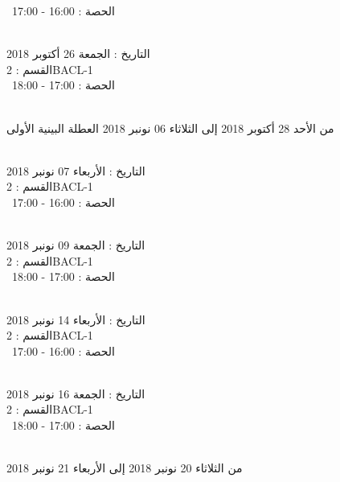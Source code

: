 \  
الحصة : 16:00 - 17:00 \\
\par
\noindent\makebox[\linewidth]{\rule{\paperwidth}{0.4pt}}
 \\
التاريخ : الجمعة 26 أكتوبر 2018 \\
القسم : 2BACL-1 \\
 \  
الحصة : 17:00 - 18:00 \\
\par
\noindent\makebox[\linewidth]{\rule{\paperwidth}{0.4pt}}
 \\
من الأحد 28 أكتوبر 2018 إلى الثلاثاء 06 نونبر 2018
\newline
\indent
 العطلة البينية الأولى
\par
\noindent\makebox[\linewidth]{\rule{\paperwidth}{0.4pt}}
 \\
التاريخ : الأربعاء 07 نونبر 2018 \\
القسم : 2BACL-1 \\
 \  
الحصة : 16:00 - 17:00 \\
\par
\noindent\makebox[\linewidth]{\rule{\paperwidth}{0.4pt}}
 \\
التاريخ : الجمعة 09 نونبر 2018 \\
القسم : 2BACL-1 \\
 \  
الحصة : 17:00 - 18:00 \\
\par
\noindent\makebox[\linewidth]{\rule{\paperwidth}{0.4pt}}
 \\
التاريخ : الأربعاء 14 نونبر 2018 \\
القسم : 2BACL-1 \\
 \  
الحصة : 16:00 - 17:00 \\
\par
\noindent\makebox[\linewidth]{\rule{\paperwidth}{0.4pt}}
 \\
التاريخ : الجمعة 16 نونبر 2018 \\
القسم : 2BACL-1 \\
 \  
الحصة : 17:00 - 18:00 \\
\par
\noindent\makebox[\linewidth]{\rule{\paperwidth}{0.4pt}}
 \\
من الثلاثاء 20 نونبر 2018 إلى الأربعاء 21 نونبر 2018
\newline
